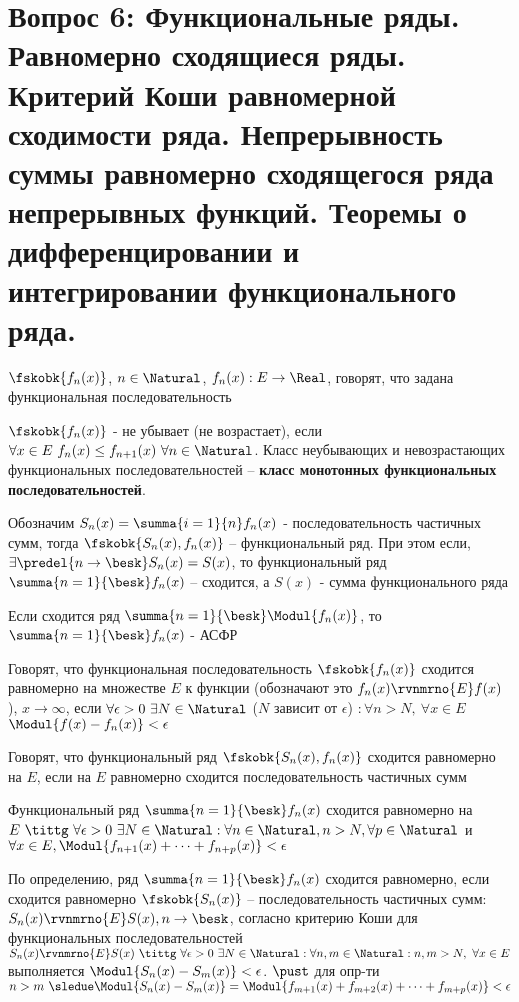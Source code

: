 \section{Вопрос 6: Функциональные ряды. Равномерно сходящиеся ряды. Критерий Коши равномерной сходимости ряда. Непрерывность суммы равномерно сходящегося ряда непрерывных функций. Теоремы о дифференцировании и интегрировании функционального ряда.}

\begin{defs}
	$\fskobk{f_{n}(x)}$, $n \in \Natural$,  $f_{n}(x): E \to \Real$, говорят, что задана функциональная последовательность

	$\fskobk{f_{n}(x)}$ - не убывает (не возрастает), если $\forall x \in E \ f_{n}(x) \leq f_{n+1}(x) \ \forall n \in \Natural$. Класс неубывающих и невозрастающих функциональных последовательностей -- \textbf{класс монотонных функциональных последовательностей}.
\end{defs}

\begin{defs}
	Обозначим $S_n(x) = \summa{i=1}{n}f_{n}(x)$ - последовательность частичных сумм, тогда $\fskobk{S_n(x), f_{n}(x)}$ -- функциональный ряд. При этом если, $\exists \predel{n\to \besk}S_n(x)=S(x)$, то функциональный ряд $\summa{n=1}{\besk}f_n(x)$ -- сходится, а $S(x)$ - сумма функционального ряда

	Если сходится ряд $\summa{n=1}{\besk}\Modul{f_n(x)}$, то $\summa{n=1}{\besk}f_n(x)$ - АСФР

	Говорят, что функциональная последовательность $\fskobk{f_{n}(x)}$ сходится равномерно на множестве $E$ к функции \fx (обозначают это $f_n(x) \rvnmrno{E} f(x)$), $x \to \infty$, если $\forall \epsilon > 0 \ \exists N \in \Natural$ ($N$ зависит от $\epsilon$) $: \forall n > N, \ \forall x \in E$ $\Modul{f(x) - f_{n}(x)} <  \epsilon$

	Говорят, что функциональный ряд $\fskobk{S_n(x), f_{n}(x)}$ сходится равномерно на $E$, если на $E$ равномерно сходится последовательность частичных сумм
\end{defs}

\begin{proofs}
	Функциональный ряд $\summa{n=1}{\besk}f_{n}(x)$ сходится равномерно на $E \ \tittg \ \forall \epsilon > 0 \ \exists N \in \Natural: \forall n \in \Natural, n > N, \forall p \in \Natural$ и $\forall x \in E, \Modul{f_{n+1}(x)+\cdots+f_{n+p}(x)} < \epsilon$
	\begin{dokvo}
		По определению, ряд $\summa{n=1}{\besk}f_n(x)$ сходится равномерно, если сходится равномерно $\fskobk{S_n(x)}$ -- последовательность частичных сумм: $S_n(x) \rvnmrno{E} S(x), n \to \besk$, согласно критерию Коши для функциональных последовательностей $S_n(x) \rvnmrno{E} S(x) \ \tittg \ \forall \epsilon > 0 \ \exists N \in \Natural: \forall n,m \in \Natural: n,m > N, \ \forall x \in E$ выполняется $\Modul{S_n(x) - S_m(x)} < \epsilon$. $\pust$ для опр-ти $n > m \ \sledue \Modul{S_n(x) - S_m(x)} = \Modul{f_{m+1}(x) + f_{m+2}(x) + \cdots + f_{m+p}(x)} < \epsilon$
	\end{dokvo}
\end{proofs}

